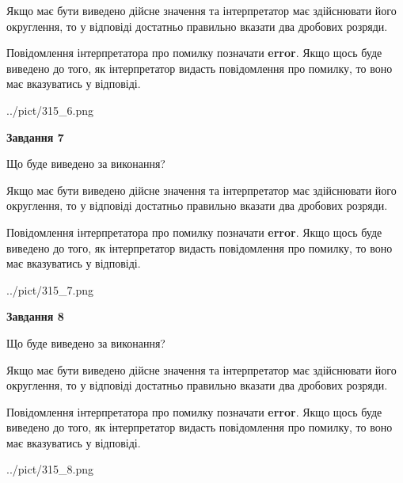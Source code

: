 \documentclass[12pt, ukrainian]{article}
\begin{document}
{\begin {Large}
Якщо має бути виведено дійсне значення та інтерпретатор має здійснювати його округлення, 
то у відповіді достатньо правильно вказати два дробових розряди.

Повідомлення інтерпретатора про помилку позначати \textbf{error}.
Якщо щось буде виведено до того, як інтерпретатор видасть повідомлення про помилку, 
то воно має вказуватись у відповіді. \par

\begin{center}
	{../pict/315_6.png}
\end{center}
\newpage

{\begin {center}\textbf{Завдання 7}\end {center}}\par
Що буде виведено за виконання? \par

Якщо має бути виведено дійсне значення та інтерпретатор має здійснювати його округлення, 
то у відповіді достатньо правильно вказати два дробових розряди.

Повідомлення інтерпретатора про помилку позначати \textbf{error}.
Якщо щось буде виведено до того, як інтерпретатор видасть повідомлення про помилку, 
то воно має вказуватись у відповіді. \par

\begin{center}
	{../pict/315_7.png}
\end{center}
\newpage

{\begin {center}\textbf{Завдання 8}\end {center}}\par
Що буде виведено за виконання? \par

Якщо має бути виведено дійсне значення та інтерпретатор має здійснювати його округлення, 
то у відповіді достатньо правильно вказати два дробових розряди.

Повідомлення інтерпретатора про помилку позначати \textbf{error}.
Якщо щось буде виведено до того, як інтерпретатор видасть повідомлення про помилку, 
то воно має вказуватись у відповіді. \par

\begin{center}
	{../pict/315_8.png}
\end{center}
\newpage


\end{Large}}
\end{document}
